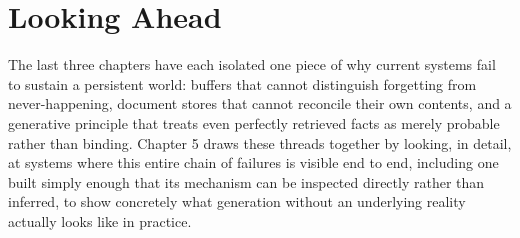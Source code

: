 \section{Looking Ahead}

The last three chapters have each isolated one piece of why current systems fail to sustain a persistent world: buffers that cannot distinguish forgetting from never-happening, document stores that cannot reconcile their own contents, and a generative principle that treats even perfectly retrieved facts as merely probable rather than binding. Chapter 5 draws these threads together by looking, in detail, at systems where this entire chain of failures is visible end to end, including one built simply enough that its mechanism can be inspected directly rather than inferred, to show concretely what generation without an underlying reality actually looks like in practice.
